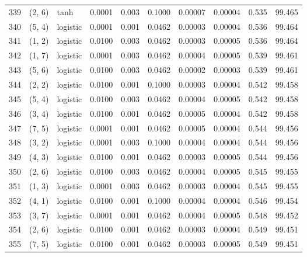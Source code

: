 \begin{tabular}{lllrrrrrrr}
339 &      (2, 6) &      tanh &  0.0001 &  0.003 &  0.1000 &          0.00007 &    0.00004 &       0.535 &    99.465 \\
340 &      (5, 4) &  logistic &  0.0001 &  0.001 &  0.0462 &          0.00003 &    0.00004 &       0.536 &    99.464 \\
341 &      (1, 2) &  logistic &  0.0100 &  0.003 &  0.0462 &          0.00003 &    0.00005 &       0.536 &    99.464 \\
342 &      (1, 7) &  logistic &  0.0001 &  0.003 &  0.0462 &          0.00004 &    0.00005 &       0.539 &    99.461 \\
343 &      (5, 6) &  logistic &  0.0100 &  0.003 &  0.0462 &          0.00002 &    0.00003 &       0.539 &    99.461 \\
344 &      (2, 2) &  logistic &  0.0100 &  0.001 &  0.1000 &          0.00003 &    0.00004 &       0.542 &    99.458 \\
345 &      (5, 4) &  logistic &  0.0100 &  0.003 &  0.0462 &          0.00004 &    0.00005 &       0.542 &    99.458 \\
346 &      (3, 4) &  logistic &  0.0100 &  0.001 &  0.0462 &          0.00005 &    0.00004 &       0.542 &    99.458 \\
347 &      (7, 5) &  logistic &  0.0001 &  0.001 &  0.0462 &          0.00005 &    0.00004 &       0.544 &    99.456 \\
348 &      (3, 2) &  logistic &  0.0001 &  0.003 &  0.1000 &          0.00004 &    0.00004 &       0.544 &    99.456 \\
349 &      (4, 3) &  logistic &  0.0100 &  0.001 &  0.0462 &          0.00003 &    0.00005 &       0.544 &    99.456 \\
350 &      (2, 6) &  logistic &  0.0100 &  0.003 &  0.0462 &          0.00004 &    0.00005 &       0.545 &    99.455 \\
351 &      (1, 3) &  logistic &  0.0001 &  0.003 &  0.0462 &          0.00003 &    0.00004 &       0.545 &    99.455 \\
352 &      (4, 1) &  logistic &  0.0100 &  0.001 &  0.1000 &          0.00004 &    0.00004 &       0.546 &    99.454 \\
353 &      (3, 7) &  logistic &  0.0001 &  0.001 &  0.0462 &          0.00004 &    0.00005 &       0.548 &    99.452 \\
354 &      (2, 6) &  logistic &  0.0100 &  0.001 &  0.0462 &          0.00003 &    0.00004 &       0.549 &    99.451 \\
355 &      (7, 5) &  logistic &  0.0100 &  0.001 &  0.0462 &          0.00003 &    0.00005 &       0.549 &    99.451 \\

\end{tabular}
